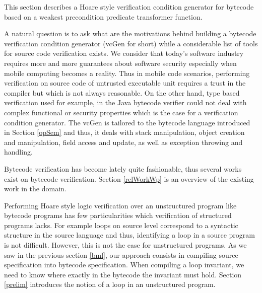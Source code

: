 \newtheorem{defLoop}{Definition}[section] 
\newtheorem{defInter}[defLoop]{Definition}
\newtheorem{defExc}[defLoop]{Definition}
\newtheorem{defInv}[defLoop]{Definition}
\newtheorem{defModif}[defLoop]{Definition}

\newtheorem{propPath}{Lemma}[section]

This section describes a Hoare style verification condition generator for bytecode based on a weakest precondition predicate transformer function.
 
A natural question is to ask what are the motivations behind building a bytecode verification condition generator (vcGen for short)
while a considerable list of tools for source code verification exists.
We consider that today's software industry requires more and more guarantees about software security especially when
mobile computing becomes a reality. Thus in mobile code scenarios, performing verification on source code of untrusted executable
 unit requires a trust in the compiler but which is not always reasonable. On the other hand,
 type based verification used for example, in the Java bytecode verifier could not deal with complex functional or security
 properties which is the case for a verification condition generator.   
The vcGen is tailored to the bytecode language introduced in Section \ref{opSem} and thus, it deals
with stack manipulation, object creation and manipulation, field access and update, as well as exception throwing and handling.

Bytecode verification has become lately quite fashionable, thus several works exist on bytecode verification. Section \ref{relWorkWp}
is an overview of the existing work in the domain.



Performing Hoare style logic verification over an unstructured program like bytecode programs has few particularities which
verification of structured programs lacks. For example loops on source level correspond to a syntactic structure in the source language and thus, identifying
a loop in a source program is not difficult.  However, this is not the case for unstructured programs. 
As we saw in the previous section \ref{bml}, our approach consists in compiling source specification into
bytecode specification. When compiling a loop invariant, we need to know where exactly in the bytecode the invariant must hold.
Section \ref{prelim} introduces the notion of a loop in an unstructured program.

